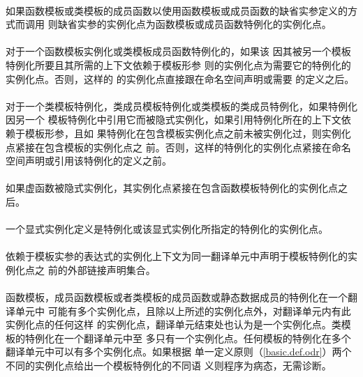 \paragraph{}
如果函数模板或类模板的成员函数以使用函数模板或成员函数的缺省实参定义的方式而调用
则缺省实参的实例化点为函数模板或成员函数特例化的实例化点。

\paragraph{}
对于一个函数模板实例化或类模板成员函数特例化的，如果该
因其被另一个模板特例化所要且其所需的上下文依赖于模板形参
则的实例化点为需要它的特例化的实例化点。否则，这样的
的实例化点直接跟在命名空间声明或需要
的定义之后。

\paragraph{}
对于一个类模板特例化，类成员模板特例化或类模板的类成员特例化，如果特例化因另一个
模板特例化中引用它而被隐式实例化，如果引用特例化所在的上下文依赖于模板形参，且如
果特例化在包含模板实例化点之前未被实例化过，则实例化点紧接在包含模板的实例化点之
前。否则，这样的特例化的实例化点紧接在命名空间声明或引用该特例化的定义之前。

\paragraph{}
如果虚函数被隐式实例化，其实例化点紧接在包含函数模板特例化的实例化点之后。

\paragraph{}
一个显式实例化定义是特例化或该显式实例化所指定的特例化的实例化点。

\paragraph{}
依赖于模板实参的表达式的实例化上下文为同一翻译单元中声明于模板特例化的实例化点之
前的外部链接声明集合。

\paragraph{}
函数模板，成员函数模板或者类模板的成员函数或静态数据成员的特例化在一个翻译单元中
可能有多个实例化点，且除以上所述的实例化点外，对翻译单元内有此实例化点的任何这样
的实例化点，翻译单元结束处也认为是一个实例化点。类模板的特例化在一个翻译单元中至
多只有一个实例化点。任何模板的特例化在多个翻译单元中可以有多个实例化点。如果根据
单一定义原则（\ref{basic.def.odr}）两个不同的实例化点给出一个模板特例化的不同语
义则程序为病态，无需诊断。

